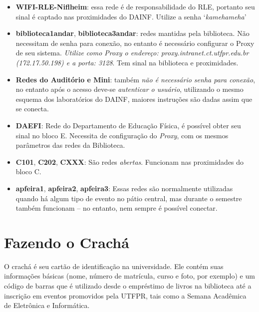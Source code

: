 \documentclass[a4paper,12pt,openany]{article}
\begin{document}
\begin{itemize}
\item \textbf{WIFI-RLE-Niflheim}: essa rede é de responsabilidade do RLE, portanto seu sinal é captado nas proximidades do DAINF. Utilize a senha ‘\textit{kamehameha}’

\item \textbf{biblioteca1andar}, \textbf{biblioteca3andar}: redes mantidas pela biblioteca. Não necessitam de senha para conexão, no entanto é necessário configurar o Proxy de seu sistema. \textit{Utilize como Proxy o endereço: proxy.intranet.ct.utfpr.edu.br (172.17.50.198) e a porta: 3128}. Tem sinal na biblioteca e proximidades.

\item\textbf{Redes do Auditório e Mini}: também \textit{não é necessário senha para conexão}, no entanto após o acesso deve-se \textit{autenticar o usuário}, utilizando o mesmo esquema dos laboratórios do DAINF, maiores instruções são dadas assim que se conecta.

\item \textbf{DAEFI}: Rede do Departamento de Educação Física, é possível obter seu sinal no bloco E. Necessita de configuração do \textit{Proxy}, com os mesmos parâmetros das redes da Biblioteca.

\item \textbf{C101}, \textbf{C202}, \textbf{CXXX}:  São redes \textit{abertas}. Funcionam nas proximidades do bloco C.

\item \textbf{apfeira1}, \textbf{apfeira2}, \textbf{apfeira3}: Essas redes são normalmente utilizadas quando há algum tipo de evento no pátio central, mas durante o semestre também funcionam – no entanto, nem sempre é possível conectar.


\end{itemize}


\newpage
\section{Fazendo o Crachá}

O crachá é seu cartão de identificação na universidade. Ele contém suas informações básicas (nome, número de matrícula, curso e foto, por exemplo) e um código de barras que é utilizado desde o empréstimo de livros na biblioteca até a inscrição em eventos promovidos pela UTFPR, tais como a Semana Acadêmica de Eletrônica e Informática.
\end{document}
